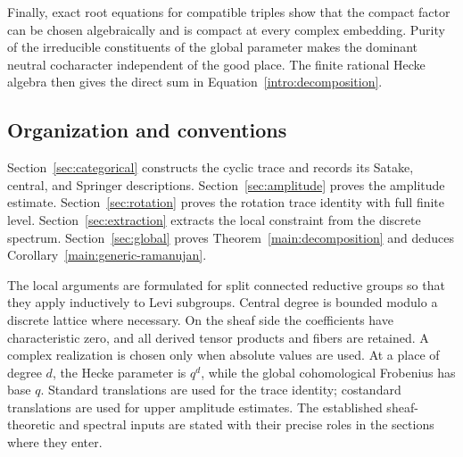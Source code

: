 Finally, exact root equations for compatible triples show that the
compact factor can be chosen algebraically and is compact at every
complex embedding. Purity of the irreducible constituents of the global
parameter makes the dominant neutral cocharacter independent of the good place.
The finite rational Hecke algebra then gives the direct sum in
Equation~\eqref{intro:decomposition}.

\subsection{Organization and conventions}

Section~\ref{sec:categorical} constructs the cyclic trace and records
its Satake, central, and Springer descriptions.
Section~\ref{sec:amplitude} proves the amplitude estimate.
Section~\ref{sec:rotation} proves the rotation trace identity with
full finite level.
Section~\ref{sec:extraction} extracts the local constraint from the
discrete spectrum.
Section~\ref{sec:global} proves Theorem~\ref{main:decomposition} and
deduces Corollary~\ref{main:generic-ramanujan}.

The local arguments are formulated for split connected reductive groups
so that they apply inductively to Levi subgroups. Central degree is
bounded modulo a discrete lattice where necessary. On the sheaf side
the coefficients have characteristic zero, and all derived tensor
products and fibers are retained. A complex realization is chosen only
when absolute values are used. At a place of degree \(d\), the Hecke
parameter is \(q^d\), while the global cohomological Frobenius has base
\(q\). Standard translations are used for the trace identity;
costandard translations are used for upper amplitude estimates.
The established sheaf-theoretic and spectral inputs are stated with
their precise roles in the sections where they enter.
